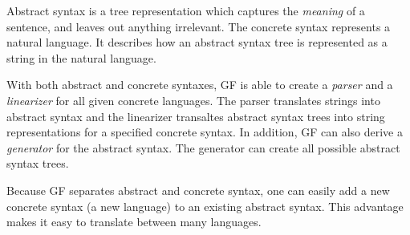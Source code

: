 Abstract syntax is a tree representation which captures the \emph{meaning} of a sentence, and leaves out anything irrelevant. The concrete syntax represents a natural language. It describes how an abstract syntax tree is represented as a string in the natural language.

With both abstract and concrete syntaxes, GF is able to create a \emph{parser} and a \emph{linearizer} for all given concrete languages. The parser translates strings into abstract syntax and the linearizer transaltes abstract syntax trees into string representations for a specified concrete syntax. In addition, GF can also derive a \emph{generator} for the abstract syntax. The generator can create all possible abstract syntax trees.

Because GF separates abstract and concrete syntax, one can easily add a new concrete syntax (a new language) to an existing abstract syntax. This advantage makes it easy to translate between many languages.